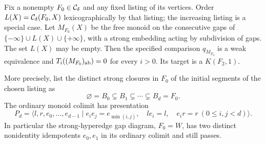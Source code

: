 \begin{theorem}
\label{G:embeddinggaps}
Fix a nonempty $F_0\in\mathcal C_\delta$ and any fixed listing of its
vertices.  Order $L(X)=\mathcal C_\delta(F_0,X)$ lexicographically by
that listing; the increasing listing is a special case.
Let $M_{F_0}(X)$ be the free
monoid on the consecutive gaps of
$\{-\infty\}\cup L(X)\cup\{+\infty\}$, with a strong
embedding acting by subdivision of gaps.  The set $L(X)$
may be empty.
Then the specified comparison $q_{M_{F_0}}$ is a weak
equivalence and $T_i((M_{F_0})_{\mathrm{ab}})=0$ for every $i>0$.
Its target is a $K(F_2,1)$.

More precisely, list the distinct strong closures in $F_0$
of the initial segments of the chosen listing as
\[
 \varnothing=B_0\subsetneq B_1\subsetneq\cdots
 \subsetneq B_d=F_0.
\]
The ordinary monoid colimit has presentation
\[
 P_d=\langle l,r,e_0,\ldots,e_{d-1}\mid
 e_i e_j=e_{\min(i,j)},\quad le_i=l,\quad e_i r=r
 \ (0\le i,j<d)\rangle.
 \tag{G.17}
\]
In particular the strong-hyperedge gap diagram, $F_0=W$,
has two distinct nonidentity idempotents $e_0,e_1$ in its
ordinary colimit and still passes.
\end{theorem}
